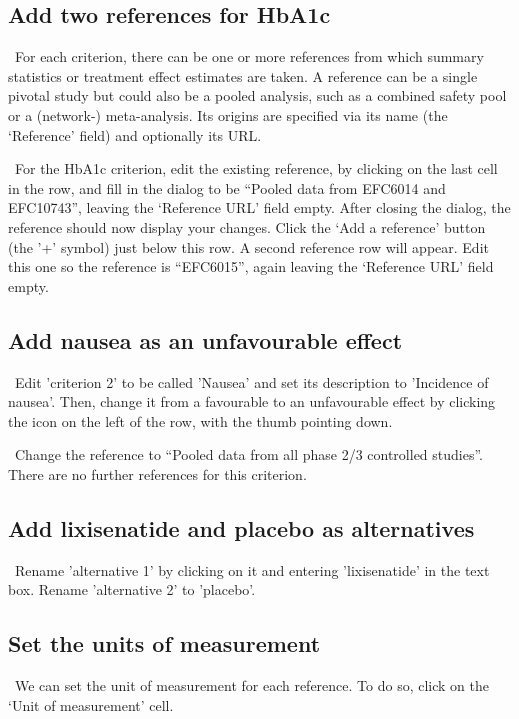 \documentclass[00_mcda_tutorial.tex]{subfiles}
\begin{document}
\subsection*{Add two references for HbA1c}
\noindent \faGraduationCap \, For each criterion, there can be one or more references from which summary statistics or treatment effect estimates are taken. A reference can be a single pivotal study but could also be a pooled analysis, such as a combined safety pool or a (network-) meta-analysis. Its origins are specified via its name (the ‘Reference’ field) and optionally its URL.
\newline

\noindent \leftpointright \, For the HbA1c criterion, edit the existing reference, by clicking on the last cell in the row, and fill in the dialog to be  “Pooled data from EFC6014 and EFC10743”, leaving the ‘Reference URL’ field empty. After closing the dialog, the reference should now display your changes. Click  the ‘Add a reference’ button (the '+' symbol) just below this row. A second reference row will appear. Edit this one so the reference is “EFC6015”, again leaving the ‘Reference URL’ field empty.

\subsection*{Add nausea as an unfavourable effect}
\noindent \leftpointright \, Edit 'criterion 2' to be called 'Nausea' and set its description to 'Incidence of nausea'. Then, change it from a favourable to an unfavourable effect by clicking the icon on the left of the row, with the thumb pointing down.
\newline

\noindent \leftpointright \, Change the reference to “Pooled data from all phase 2/3 controlled studies”.  There are no further references for this criterion.

\subsection*{Add lixisenatide and placebo as alternatives}
\noindent \leftpointright \, Rename 'alternative 1' by clicking on it and entering 'lixisenatide' in the text box. Rename 'alternative 2' to 'placebo'.

\subsection*{Set the units of measurement}
\noindent \leftpointright \, We can set the unit of measurement for each reference. To do so, click on the ‘Unit of measurement’ cell.
\newline
\end{document}
